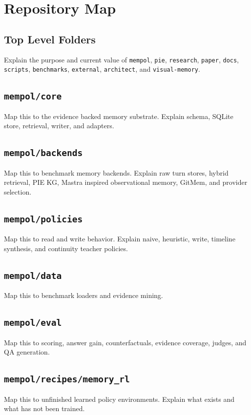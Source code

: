 \documentclass[11pt]{article}
\begin{document}
\section{Repository Map}

\subsection{Top Level Folders}
Explain the purpose and current value of \texttt{mempol}, \texttt{pie}, \texttt{research}, \texttt{paper}, \texttt{docs}, \texttt{scripts}, \texttt{benchmarks}, \texttt{external}, \texttt{architect}, and \texttt{visual-memory}.

\subsection{\texttt{mempol/core}}
Map this to the evidence backed memory substrate. Explain schema, SQLite store, retrieval, writer, and adapters.

\subsection{\texttt{mempol/backends}}
Map this to benchmark memory backends. Explain raw turn stores, hybrid retrieval, PIE KG, Mastra inspired observational memory, GitMem, and provider selection.

\subsection{\texttt{mempol/policies}}
Map this to read and write behavior. Explain naive, heuristic, write, timeline synthesis, and continuity teacher policies.

\subsection{\texttt{mempol/data}}
Map this to benchmark loaders and evidence mining.

\subsection{\texttt{mempol/eval}}
Map this to scoring, answer gain, counterfactuals, evidence coverage, judges, and QA generation.

\subsection{\texttt{mempol/recipes/memory\_rl}}
Map this to unfinished learned policy environments. Explain what exists and what has not been trained.
\end{document}
